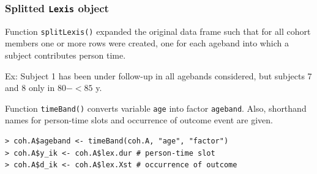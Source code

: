 \documentclass[handout,12pt]{beamer}
\begin{document}
\begin{frame}[fragile]

\frametitle{Splitted \texttt{Lexis} object}

\bi
\item
Function \texttt{splitLexis()} expanded the original data frame such that
for all cohort members one or more rows were created, one for
each ageband into which a subject contributes person time.
\medskip
\item
Ex: Subject 1 has been under follow-up in all agebands considered, but subjects 7 and 8 only in 80$-<85$ y.
\medskip
\item
Function \texttt{timeBand()} 
converts variable \texttt{age} into 
factor \texttt{ageband}. Also, shorthand
names for person-time slots and occurrence of outcome event are given.
\small
\begin{verbatim}
> coh.A$ageband <- timeBand(coh.A, "age", "factor") 
> coh.A$y_ik <- coh.A$lex.dur # person-time slot
> coh.A$d_ik <- coh.A$lex.Xst # occurrence of outcome
\end{verbatim}
\normalsize
\ei

\end{frame} 
\end{document}
